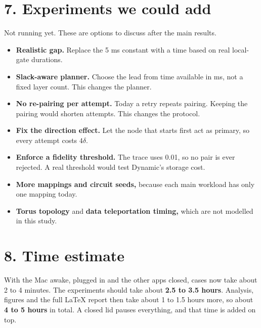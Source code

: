 \documentclass[10.5pt,a4paper]{article}
\begin{document}
\section*{7. Experiments we could add}
Not running yet. These are options to discuss after the main results.
\begin{itemize}\setlength{\itemsep}{1pt}
\item \textbf{Realistic gap.} Replace the 5 ms constant with a time based on real local-gate durations.
\item \textbf{Slack-aware planner.} Choose the lead from time available in ms, not a fixed layer count. This changes the planner.
\item \textbf{No re-pairing per attempt.} Today a retry repeats pairing. Keeping the pairing would shorten attempts. This changes the protocol.
\item \textbf{Fix the direction effect.} Let the node that starts first act as primary, so every attempt costs $4\delta$.
\item \textbf{Enforce a fidelity threshold.} The trace uses 0.01, so no pair is ever rejected. A real threshold would test Dynamic's storage cost.
\item \textbf{More mappings and circuit seeds,} because each main workload has only one mapping today.
\item \textbf{Torus topology} and \textbf{data teleportation timing,} which are not modelled in this study.
\end{itemize}

\section*{8. Time estimate}
With the Mac awake, plugged in and the other apps closed, cases now take about 2 to 4 minutes.
The experiments should take about \textbf{2.5 to 3.5 hours}. Analysis, figures and the full LaTeX report then take about 1 to 1.5 hours more,
so about \textbf{4 to 5 hours} in total. A closed lid pauses everything, and that time is added on top.
\end{document}
